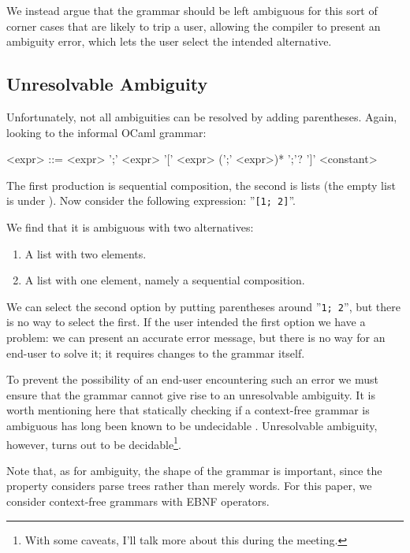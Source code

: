 \documentclass[acmsmall,review,anonymous]{acmart}\settopmatter{printfolios=true,printccs=false,printacmref=false}
\newcommand{\ocaml}{\lstinline[language={[objective]caml}]}
\newcommand{\alt}{\mathit{alt}} %
\begin{document}
We instead argue that the grammar should be left ambiguous for this sort of corner cases that are likely to trip a user, allowing the compiler to present an ambiguity error, which lets the user select the intended alternative.

\subsection{Unresolvable Ambiguity}

Unfortunately, not all ambiguities can be resolved by adding parentheses. Again, looking to the informal OCaml grammar:

\setlength{\grammarindent}{5em}
\begin{grammar}
<expr> ::= <expr> ';' <expr>
  \alt '[' <expr> (';' <expr>)* ';'? ']'
  \alt <constant>
\end{grammar}

\noindent The first production is sequential composition, the second is lists (the empty list is under ). Now consider the following expression: ''\ocaml{[1; 2]}''.

We find that it is ambiguous with two alternatives:
\begin{enumerate}
  \item A list with two elements.
  \item A list with one element, namely a sequential composition.
\end{enumerate}

We can select the second option by putting parentheses around ''\ocaml{1; 2}'', but there is no way to select the first. If the user intended the first option we have a problem: we can present an accurate error message, but there is no way for an end-user to solve it; it requires changes to the grammar itself.

To prevent the possibility of an end-user encountering such an error we must ensure that the grammar cannot give rise to an unresolvable ambiguity. It is worth mentioning here that statically checking if a context-free grammar is ambiguous has long been known to be undecidable \cite{cantorAmbiguityProblemBackus1962}. Unresolvable ambiguity, however, turns out to be decidable\footnote{With some caveats, I'll talk more about this during the meeting.}.

Note that, as for ambiguity, the shape of the grammar is important, since the property considers parse trees rather than merely words. For this paper, we consider context-free grammars with EBNF operators.
\end{document}
